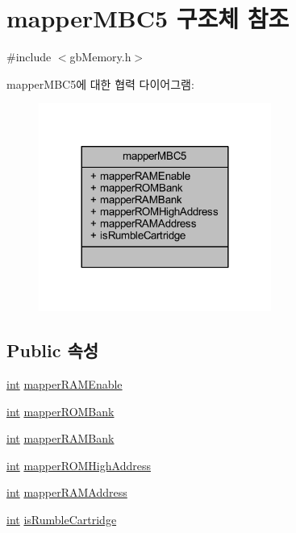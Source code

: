 \hypertarget{structmapper_m_b_c5}{}\section{mapper\+M\+B\+C5 구조체 참조}
\label{structmapper_m_b_c5}


{\ttfamily \#include $<$gb\+Memory.\+h$>$}



mapper\+M\+B\+C5에 대한 협력 다이어그램\+:\nopagebreak
\begin{figure}[H]
\begin{center}
\leavevmode
\includegraphics[width=216pt]{structmapper_m_b_c5__coll__graph}
\end{center}
\end{figure}
\subsection*{Public 속성}
\begin{DoxyCompactItemize}
\item 
\mbox{\hyperlink{_util_8cpp_a0ef32aa8672df19503a49fab2d0c8071}{int}} \mbox{\hyperlink{structmapper_m_b_c5_a719277ef6f243d6270d394eb4f6701e7}{mapper\+R\+A\+M\+Enable}}
\item 
\mbox{\hyperlink{_util_8cpp_a0ef32aa8672df19503a49fab2d0c8071}{int}} \mbox{\hyperlink{structmapper_m_b_c5_a6c1503dde2a71a9cca438b331fc2f96a}{mapper\+R\+O\+M\+Bank}}
\item 
\mbox{\hyperlink{_util_8cpp_a0ef32aa8672df19503a49fab2d0c8071}{int}} \mbox{\hyperlink{structmapper_m_b_c5_a44f10df4538a1a90080cf625203ddfe9}{mapper\+R\+A\+M\+Bank}}
\item 
\mbox{\hyperlink{_util_8cpp_a0ef32aa8672df19503a49fab2d0c8071}{int}} \mbox{\hyperlink{structmapper_m_b_c5_ac439fc9836d18dece2da122cca4cb0be}{mapper\+R\+O\+M\+High\+Address}}
\item 
\mbox{\hyperlink{_util_8cpp_a0ef32aa8672df19503a49fab2d0c8071}{int}} \mbox{\hyperlink{structmapper_m_b_c5_ac0566cbc10191dba164d756ed2750ef9}{mapper\+R\+A\+M\+Address}}
\item 
\mbox{\hyperlink{_util_8cpp_a0ef32aa8672df19503a49fab2d0c8071}{int}} \mbox{\hyperlink{structmapper_m_b_c5_af30d38450c27d153ee0cf288a2c3a9cc}{is\+Rumble\+Cartridge}}
\end{DoxyCompactItemize}


